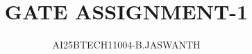 \documentclass[journal]{IEEEtran}
\begin{document}

\vspace{3cm}


\renewcommand{\thetable}{\theenumi}




\vspace{3cm}


\title{GATE ASSIGNMENT-1}
\author{AI25BTECH11004-B.JASWANTH}
{\let\newpage\relax\maketitle}


\renewcommand{\thefigure}{\theenumi}
\renewcommand{\thetable}{\theenumi}
\setlength{\intextsep}{10pt} %
\end{document}
